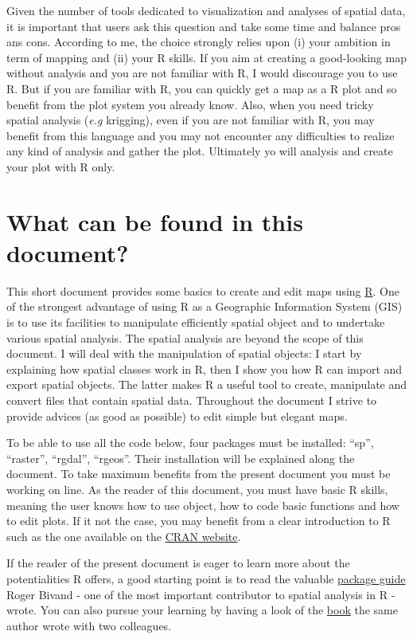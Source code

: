 \documentclass[]{report}
\begin{document}
Given the number of tools dedicated to visualization and analyses of
spatial data, it is important that users ask this question and take some
time and balance pros ans cons. According to me, the choice strongly
relies upon (i) your ambition in term of mapping and (ii) your R skills.
If you aim at creating a good-looking map without analysis and you are
not familiar with R, I would discourage you to use R. But if you are
familiar with R, you can quickly get a map as a R plot and so benefit
from the plot system you already know. Also, when you need tricky
spatial analysis (\emph{e.g} krigging), even if you are not familiar
with R, you may benefit from this language and you may not encounter any
difficulties to realize any kind of analysis and gather the plot.
Ultimately yo will analysis and create your plot with R only.

\section{What can be found in this
document?}\label{what-can-be-found-in-this-document}

This short document provides some basics to create and edit maps using
\href{https://cran.r-project.org}{R}. One of the strongest advantage of
using R as a Geographic Information System (GIS) is to use its
facilities to manipulate efficiently spatial object and to undertake
various spatial analysis. The spatial analysis are beyond the scope of
this document. I will deal with the manipulation of spatial objects: I
start by explaining how spatial classes work in R, then I show you how R
can import and export spatial objects. The latter makes R a useful tool
to create, manipulate and convert files that contain spatial data.
Throughout the document I strive to provide advices (as good as
possible) to edit simple but elegant maps.

To be able to use all the code below, four packages must be installed:
``sp'', ``raster'', ``rgdal'', ``rgeos''. Their installation will be
explained along the document. To take maximum benefits from the present
document you must be working on line. As the reader of this document,
you must have basic R skills, meaning the user knows how to use object,
how to code basic functions and how to edit plots. If it not the case,
you may benefit from a clear introduction to R such as the one available
on the
\href{http://cran.r-project.org/doc/manuals/r-release/R-intro.html}{CRAN
website}.

If the reader of the present document is eager to learn more about the
potentialities R offers, a good starting point is to read the valuable
\href{http://cran.r-project.org/web/views/Spatial.html}{package guide}
Roger Bivand - one of the most important contributor to spatial analysis
in R - wrote. You can also pursue your learning by having a look of the
\href{http://link.springer.com/book/10.1007/978-1-4614-7618-4}{book} the
same author wrote with two colleagues.
\end{document}
